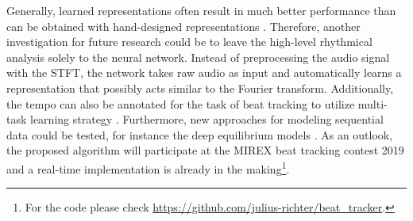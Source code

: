 \documentclass{scrartcl}
\begin{document}
Generally, learned representations often result in much better performance than can be obtained with hand-designed representations \cite{Goodfellow2016}. Therefore, another investigation for future research could be to leave the high-level rhythmical analysis solely to the neural network. Instead of preprocessing the audio signal with the STFT, the network takes raw audio as input and automatically learns a representation that possibly acts similar to the Fourier transform. Additionally, the tempo can also be annotated for the task of beat tracking to utilize multi-task learning strategy \cite{Boeck2019}. Furthermore, new approaches for modeling sequential data could be tested, for instance the deep equilibrium models \cite{Bai2019b}. As an outlook, the proposed algorithm will participate at the MIREX beat tracking contest 2019 and a real-time implementation is already in the making\footnote{For the code please check \url{https://github.com/julius-richter/beat_tracker}.}.







\newpage 


\end{document}
